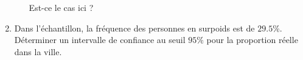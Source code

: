 \begin{exercice}
\begin{enumerate}
\begin{enumerate}
                    Est-ce le cas ici ?
            \end{enumerate}
        \item
            Dans l'échantillon, la fréquence des personnes en surpoids est de \( 29.5\%\). Déterminer un intervalle de confiance au seuil \( 95\%\) pour la proportion réelle dans la ville.
            
    \end{enumerate}
    
\end{exercice}

